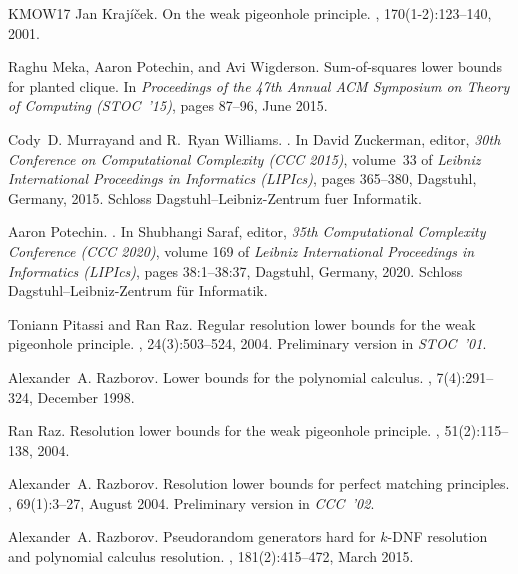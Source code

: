 \documentclass[10pt,a4paper]{article}
\theoremstyle{plain}
\theoremstyle{remark}
\theoremstyle{definition}
\begin{document}
\begin{thebibliography}{KMOW17}
Jan Krajíček.
\newblock On the weak pigeonhole principle.
, 170(1-2):123--140, 2001.

Raghu Meka, Aaron Potechin, and Avi Wigderson.
\newblock Sum-of-squares lower bounds for planted clique.
\newblock In {\em Proceedings of the 47th Annual ACM Symposium on Theory of
  Computing ({STOC}~'15)}, pages 87\nobreakdash--96, June 2015.

Cody~D. Murrayand and R.~Ryan Williams.
.
\newblock In David Zuckerman, editor, {\em 30th Conference on Computational
  Complexity (CCC 2015)}, volume~33 of {\em Leibniz International Proceedings
  in Informatics (LIPIcs)}, pages 365--380, Dagstuhl, Germany, 2015. Schloss
  Dagstuhl--Leibniz-Zentrum fuer Informatik.

Aaron Potechin.
.
\newblock In Shubhangi Saraf, editor, {\em 35th Computational Complexity
  Conference (CCC 2020)}, volume 169 of {\em Leibniz International Proceedings
  in Informatics (LIPIcs)}, pages 38:1--38:37, Dagstuhl, Germany, 2020. Schloss
  Dagstuhl--Leibniz-Zentrum f{\"u}r Informatik.

Toniann Pitassi and Ran Raz.
\newblock Regular resolution lower bounds for the weak pigeonhole principle.
, 24(3):503--524, 2004.
\newblock Preliminary version in \emph{STOC~'01}.

Alexander~A. Razborov.
\newblock Lower bounds for the polynomial calculus.
, 7(4):291\nobreakdash--324, December
  1998.

Ran Raz.
\newblock Resolution lower bounds for the weak pigeonhole principle.
, 51(2):115--138, 2004.

Alexander~A. Razborov.
\newblock Resolution lower bounds for perfect matching principles.
,
  69(1):3\nobreakdash--27, August 2004.
\newblock Preliminary version in \emph{CCC~'02}.

Alexander~A. Razborov.
\newblock Pseudorandom generators hard for \mbox{$k$-{DNF}} resolution and
  polynomial calculus resolution.
, 181(2):415\nobreakdash--472, March 2015.


\end{thebibliography}
\end{document}
